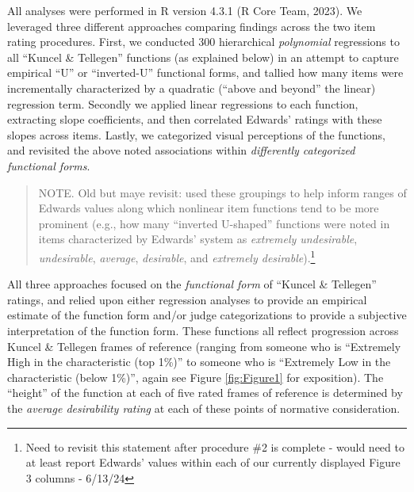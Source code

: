 \documentclass[
  ,jou]{apa6}
\begin{document}
All analyses were performed in R version 4.3.1 (R Core Team, 2023). We leveraged three different approaches comparing findings across the two item rating procedures. First, we conducted 300 hierarchical \emph{polynomial} regressions to all ``Kuncel \& Tellegen'' functions (as explained below) in an attempt to capture empirical ``U'' or ``inverted-U'' functional forms, and tallied how many items were incrementally characterized by a quadratic (``above and beyond'' the linear) regression term. Secondly we applied linear regressions to each function, extracting slope coefficients, and then correlated Edwards' ratings with these slopes across items. Lastly, we categorized visual perceptions of the functions, and revisited the above noted associations within \emph{differently categorized functional forms}.

\begin{quote}
NOTE. Old but maye revisit: used these groupings to help inform ranges of Edwards values along which nonlinear item functions tend to be more prominent (e.g., how many ``inverted U-shaped'' functions were noted in items characterized by Edwards' system as \emph{extremely undesirable}, \emph{undesirable}, \emph{average}, \emph{desirable}, and \emph{extremely desirable}).\footnote{Need to revisit this statement after procedure \#2 is complete - would need to at least report Edwards' values within each of our currently displayed Figure 3 columns - 6/13/24}
\end{quote}

All three approaches focused on the \emph{functional form} of ``Kuncel \& Tellegen'' ratings, and relied upon either regression analyses to provide an empirical estimate of the function form and/or judge categorizations to provide a subjective interpretation of the function form. These functions all reflect progression across Kuncel \& Tellegen frames of reference (ranging from someone who is ``Extremely High in the characteristic (top 1\%)'' to someone who is ``Extremely Low in the characteristic (below 1\%)'', again see Figure \ref{fig:Figure1} for exposition). The ``height'' of the function at each of five rated frames of reference is determined by the \emph{average desirability rating} at each of these points of normative consideration.
\end{document}
